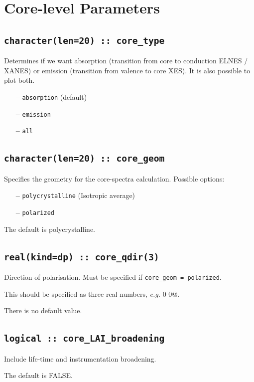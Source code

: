 \documentclass[a4paper,11pt,twoside]{book}
\begin{document}
{\section{Core-level Parameters}

\subsection[core\_geom]{\tt character(len=20) :: core\_type}

Determines if we want absorption (transition from core to conduction
ELNES / XANES)
or emission (transition from valence to core XES). It is also possible
to plot both.
\begin{itemize}
\item[{\bf --}]  \verb#absorption# (default)
\item[{\bf --}]  \verb#emission#
\item[{\bf --}]  \verb#all#
\end{itemize}

\subsection[core\_geom]{\tt character(len=20) :: core\_geom}

Specifies the geometry for the core-spectra calculation.  Possible options:
\begin{itemize}
\item[{\bf --}]  \verb#polycrystalline# (Isotropic average)
\item[{\bf --}]  \verb#polarized#
\end{itemize}
The default is polycrystalline.

\subsection[core\_qdir]{\tt real(kind=dp) :: core\_qdir(3)}
Direction of polarisation. Must be specified if \verb#core_geom = polarized#.

This should be specified as three real numbers, \emph{e.g.}  0 0@.

There is no default value.

\subsection[core\_LAI\_broadening]{\tt logical :: core\_LAI\_broadening}
Include life-time and instrumentation broadening.

The default is FALSE.

}
\end{document}
